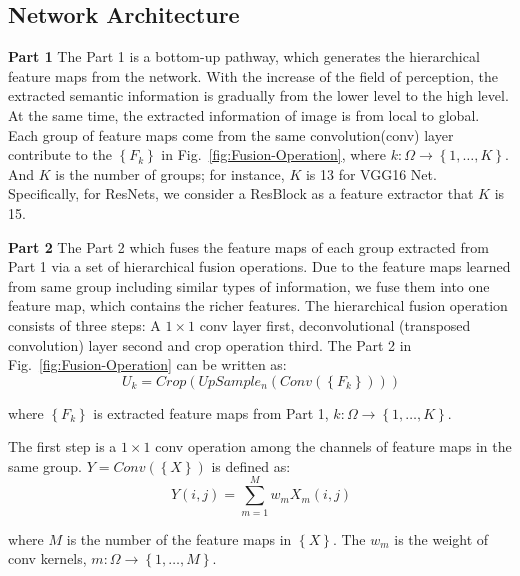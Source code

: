 \subsection{Network Architecture}

\textbf{Part 1} The Part 1 is a bottom-up pathway, which generates the hierarchical feature maps from the network. With the increase of the field of perception, the extracted semantic information is gradually from the lower level to the high level. At the same time, the extracted information of image is from local to global. Each group of feature maps come from the same convolution(conv) layer contribute to the ${\left\{F_{k}\right\}}$ in Fig.~\ref{fig:Fusion-Operation}, where ${k:\Omega \to\left\{1,\ldots,K\right\}}$. And ${K}$ is the number of groups; for instance, ${K}$ is 13 for VGG16 Net. Specifically, for ResNets, we consider a ResBlock as a feature extractor that ${K}$ is 15.

\textbf{Part 2} The Part 2 which fuses the feature maps of each group extracted from Part 1 via a set of hierarchical fusion operations. Due to the feature maps learned from same group including similar types of information, we fuse them into one feature map, which contains the richer features. The hierarchical fusion operation consists of three steps:
A ${1\times1}$ conv layer first, deconvolutional (transposed convolution) layer second and crop operation third.
The Part 2 in Fig.~\ref{fig:Fusion-Operation} can be written as:
\begin{equation}
    \label{fusion_1}
    \ U_{k}=Crop(UpSample_n(Conv(\left\{F_{k}\right\})))
\end{equation}

where ${\left\{F_{k}\right\}}$ is extracted feature maps from Part 1, ${k:\Omega \to\left\{1,\ldots,K\right\}}$.

The first step is a ${1\times1}$ conv operation among the channels of feature maps in the same group.
${Y = Conv(\left\{X\right\})}$ is defined as:
\begin{equation}
    \label{Conv}
    \ Y(i,j)=\sum_{m=1}^{M}w_{m}X_{m}(i,j)
\end{equation}

 where ${M}$ is the number of the feature maps in ${\left\{X\right\}}$. The ${w_{m}}$ is the weight of conv kernels, ${m:\Omega \to\left\{1,\ldots,M\right\}}$.


